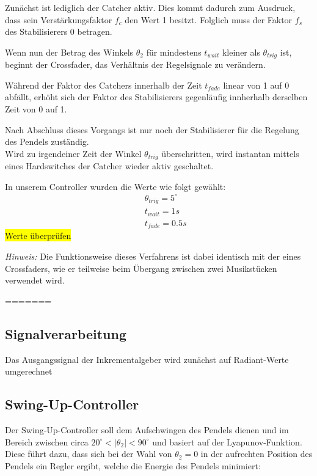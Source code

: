 Zunächst ist lediglich der Catcher aktiv. Dies kommt dadurch zum Ausdruck, dass sein Verstärkungsfaktor $f_c$ den Wert 1 besitzt. Folglich muss der Faktor $f_s$ des Stabilisierers 0 betragen.

Wenn nun der Betrag des Winkels $\theta_2$ für mindestens $t_{wait}$ kleiner als $\theta_{trig}$ ist, beginnt der Crossfader, das Verhältnis der Regelsignale zu verändern.

Während der Faktor des Catchers innerhalb der Zeit $t_{fade}$ linear von 1 auf 0 abfällt, erhöht sich der Faktor des Stabilisierers gegenläufig innherhalb derselben Zeit von 0 auf 1.

Nach Abschluss dieses Vorgangs ist nur noch der Stabilisierer für die Regelung des Pendels zuständig. \\

Wird zu irgendeiner Zeit der Winkel $\theta_{trig}$ überschritten, wird instantan mittels eines Hardswitches der Catcher wieder aktiv geschaltet.

In unserem Controller wurden die Werte wie folgt gewählt:
\begin{eqnarray*}
&& \theta_{trig} = 5^{\circ} \\
&& t_{wait} = 1 s \\
&& t_{fade} = 0.5 s
\end{eqnarray*}
\colorbox{yellow}{Werte überprüfen}


\textit{Hinweis:} Die Funktionsweise dieses Verfahrens ist dabei identisch mit der eines Crossfaders, wie er teilweise beim Übergang zwischen zwei Musikstücken verwendet wird.



=======
\label{sec.Controller}
\subsection{Signalverarbeitung}
\label{signalverarbeitung} 
Das Ausgangssignal der Inkrementalgeber wird zunächst auf Radiant-Werte umgerechnet 

\subsection{Swing-Up-Controller}
\label{Swing-Up-Controller} 

Der Swing-Up-Controller soll dem Aufschwingen des Pendels dienen und im Bereich zwischen circa $20^\circ < \left| \theta_2 \right| < 90^\circ$  und basiert auf der Lyapunov-Funktion. Diese führt dazu, dass sich bei der Wahl von
$ \theta_2 = 0$ in der aufrechten Position des Pendels ein Regler ergibt, welche die Energie des Pendels minimiert:

